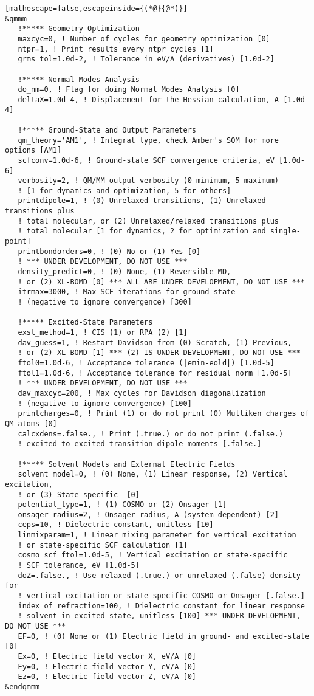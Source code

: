 \begin{lstlisting}[mathescape=false,escapeinside={(*@}{@*)}]
&qmmm
   !***** Geometry Optimization
   maxcyc=0, ! Number of cycles for geometry optimization [0]
   ntpr=1, ! Print results every ntpr cycles [1]
   grms_tol=1.0d-2, ! Tolerance in eV/A (derivatives) [1.0d-2]

   !***** Normal Modes Analysis
   do_nm=0, ! Flag for doing Normal Modes Analysis [0]
   deltaX=1.0d-4, ! Displacement for the Hessian calculation, A [1.0d-4]

   !***** Ground-State and Output Parameters
   qm_theory='AM1', ! Integral type, check Amber's SQM for more options [AM1]
   scfconv=1.0d-6, ! Ground-state SCF convergence criteria, eV [1.0d-6]
   verbosity=2, ! QM/MM output verbosity (0-minimum, 5-maximum)
   ! [1 for dynamics and optimization, 5 for others]
   printdipole=1, ! (0) Unrelaxed transitions, (1) Unrelaxed transitions plus
   ! total molecular, or (2) Unrelaxed/relaxed transitions plus
   ! total molecular [1 for dynamics, 2 for optimization and single-point]
   printbondorders=0, ! (0) No or (1) Yes [0]
   ! *** UNDER DEVELOPMENT, DO NOT USE ***
   density_predict=0, ! (0) None, (1) Reversible MD,
   ! or (2) XL-BOMD [0] *** ALL ARE UNDER DEVELOPMENT, DO NOT USE ***
   itrmax=3000, ! Max SCF iterations for ground state
   ! (negative to ignore convergence) [300]

   !***** Excited-State Parameters
   exst_method=1, ! CIS (1) or RPA (2) [1]
   dav_guess=1, ! Restart Davidson from (0) Scratch, (1) Previous,
   ! or (2) XL-BOMD [1] *** (2) IS UNDER DEVELOPMENT, DO NOT USE ***
   ftol0=1.0d-6, ! Acceptance tolerance (|emin-eold|) [1.0d-5]
   ftol1=1.0d-6, ! Acceptance tolerance for residual norm [1.0d-5]
   ! *** UNDER DEVELOPMENT, DO NOT USE ***
   dav_maxcyc=200, ! Max cycles for Davidson diagonalization
   ! (negative to ignore convergence) [100]
   printcharges=0, ! Print (1) or do not print (0) Mulliken charges of QM atoms [0]
   calcxdens=.false., ! Print (.true.) or do not print (.false.)
   ! excited-to-excited transition dipole moments [.false.]

   !***** Solvent Models and External Electric Fields
   solvent_model=0, ! (0) None, (1) Linear response, (2) Vertical excitation,
   ! or (3) State-specific  [0]
   potential_type=1, ! (1) COSMO or (2) Onsager [1]
   onsager_radius=2, ! Onsager radius, A (system dependent) [2]
   ceps=10, ! Dielectric constant, unitless [10]
   linmixparam=1, ! Linear mixing parameter for vertical excitation
   ! or state-specific SCF calculation [1]
   cosmo_scf_ftol=1.0d-5, ! Vertical excitation or state-specific
   ! SCF tolerance, eV [1.0d-5]
   doZ=.false., ! Use relaxed (.true.) or unrelaxed (.false) density for
   ! vertical excitation or state-specific COSMO or Onsager [.false.]
   index_of_refraction=100, ! Dielectric constant for linear response
   ! solvent in excited-state, unitless [100] *** UNDER DEVELOPMENT, DO NOT USE ***
   EF=0, ! (0) None or (1) Electric field in ground- and excited-state [0]
   Ex=0, ! Electric field vector X, eV/A [0]
   Ey=0, ! Electric field vector Y, eV/A [0]
   Ez=0, ! Electric field vector Z, eV/A [0]
&endqmmm


\end{lstlisting}
